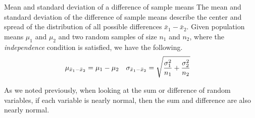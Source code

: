 \begin{onebox}{Mean and standard deviation of a difference of sample means}
The mean and standard deviation of the difference of sample means describe the center and spread of the distribution of all possible differences $\bar{x}_1-\bar{x}_2$.  Given population means $\mu_1$ and $\mu_2$ and two random samples of size $n_1$ and $n_2$, where the \emph{independence} condition is satisfied, we have the following. 
\begin{align*}
\mu_{\bar{x}_1 - \bar{x}_2} &= \mu_1 - \mu_2
	& \sigma_{\bar{x}_1 - \bar{x}_2}&=  \sqrt{\frac{\sigma_1^2}{n_1} + \frac{\sigma_2^2}{n_2}}
	\vspace{1mm}
\end{align*}\end{onebox}

As we noted previously, when looking at the sum or difference of random variables, if each variable is nearly normal, then the sum and difference are also nearly normal.

